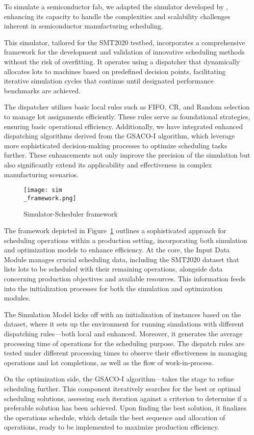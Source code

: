 To simulate a semiconductor fab, we adapted the simulator developed by \cite{Kovacs2022}, enhancing its capacity to handle the complexities and scalability challenges inherent in semiconductor manufacturing scheduling.

This simulator, tailored for the SMT2020 testbed, incorporates a comprehensive framework for the development and validation of innovative scheduling methods without the risk of overfitting. It operates using a dispatcher that dynamically allocates lots to machines based on predefined decision points, facilitating iterative simulation cycles that continue until designated performance benchmarks are achieved.

The dispatcher utilizes basic local rules such as FIFO, CR, and Random selection to manage lot assignments efficiently. These rules serve as foundational strategies, ensuring basic operational efficiency. Additionally, we have integrated enhanced dispatching algorithms derived from the GSACO-I algorithm, which leverage more sophisticated decision-making processes to optimize scheduling tasks further. These enhancements not only improve the precision of the simulation but also significantly extend its applicability and effectiveness in complex manufacturing scenarios.

\begin{figure}[t]
	\texttt{[image: sim\\\_framework.png]}
	\caption{Simulator-Scheduler framework}
	\label{fig:ss}
\end{figure}

The framework depicted in Figure~\ref{fig:ss} outlines a sophisticated approach for scheduling operations within a production setting, incorporating both simulation and optimization models to enhance efficiency. At the core, the Input Data Module manages crucial scheduling data, including the SMT2020 dataset that lists lots to be scheduled with their remaining operations, alongside data concerning production objectives and available resources. This information feeds into the initialization processes for both the simulation and optimization modules.

The Simulation Model kicks off with an initialization of instances based on the dataset, where it sets up the environment for running simulations with different dispatching rules—both local and enhanced. Moreover, it generates the average processing time of operations for the scheduling purpose.
The dispatch rules are tested under different processing times to observe their effectiveness in managing operations and lot completions, as well as the flow of work-in-process.

On the optimization side, the GSACO-I algorithm—takes the stage to refine scheduling further. This component iteratively searches for the best or optimal scheduling solutions, assessing each iteration against a criterion to determine if a preferable solution has been achieved. Upon finding the best solution, it finalizes the operations schedule, which details the best sequence and allocation of operations, ready to be implemented to maximize production efficiency.